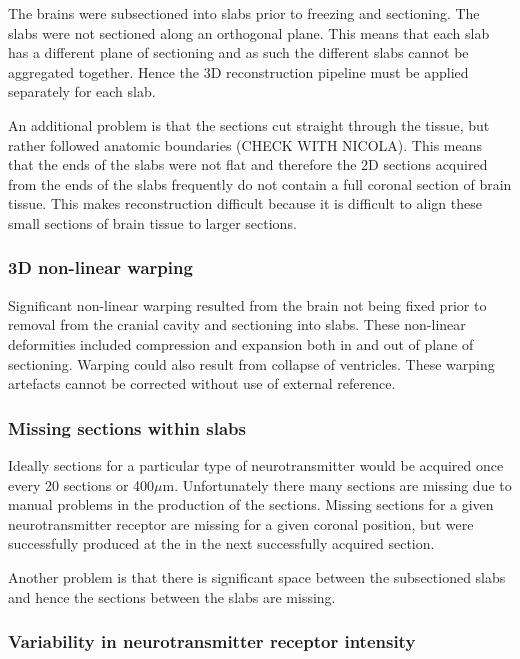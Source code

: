 \documentclass[12pt]{article}
\begin{document}
The brains were subsectioned into slabs prior to freezing and sectioning. The slabs were not sectioned along an orthogonal plane. This means that each slab has a different plane of sectioning and as such the different slabs cannot be aggregated together. Hence the 3D reconstruction pipeline must be applied separately for each slab. 

An additional problem is that the sections cut straight through the tissue, but rather followed anatomic boundaries (CHECK WITH NICOLA). This means that the ends of the slabs were not flat and therefore the 2D sections acquired from the ends of the slabs frequently do not contain a full coronal section of brain tissue. This makes reconstruction difficult because it is difficult to align these small sections of brain tissue to larger sections. 

\subsubsection{3D non-linear warping}

Significant non-linear warping resulted from the brain not being fixed prior to removal from the cranial cavity and sectioning into slabs. These non-linear deformities included compression and expansion both in and out of plane of sectioning. Warping could also result from collapse of ventricles. These warping artefacts cannot be corrected without use of external reference. 

\subsubsection{Missing sections within slabs}

Ideally sections for a particular type of neurotransmitter would be acquired once every 20 sections or 400$\mu$m. Unfortunately there many sections are missing due to manual problems in the production of the sections. Missing sections for a given neurotransmitter receptor are missing for a given coronal position, but were successfully produced at the in the next successfully acquired section.

Another problem is that there is significant space between the subsectioned slabs and hence the sections between the slabs are missing.

\subsubsection{Variability in neurotransmitter receptor intensity}
\end{document}
